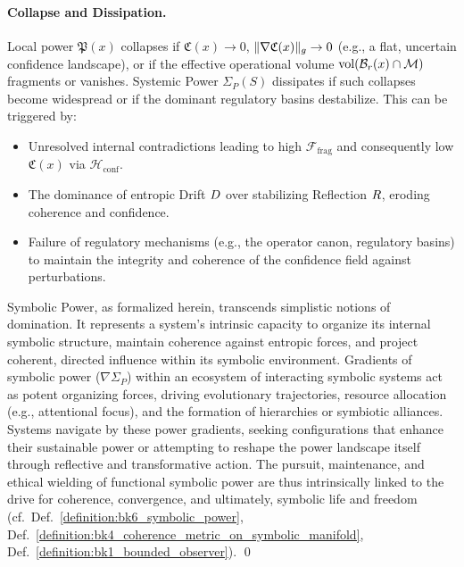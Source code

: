 \paragraph{Collapse and Dissipation.} Local power \(\mathfrak{P}(x)\) collapses if \(\mathfrak{C}(x) \to 0\), \(\|\nabla \mathfrak{C}(x)\|_{g} \to 0\) (e.g., a flat, uncertain confidence landscape), or if the effective operational volume \(\text{vol}(\mathcal{B}_r(x) \cap \mathcal{M})\) fragments or vanishes. Systemic Power \(\Sigma_P(S)\) dissipates if such collapses become widespread or if the dominant regulatory basins destabilize. This can be triggered by:
\begin{itemize}
    \item Unresolved internal contradictions leading to high \(\mathcal{F}_{\text{frag}}\) and consequently low \(\mathfrak{C}(x)\) via \(\mathcal{H}_{\text{conf}}\).
    \item The dominance of entropic Drift \(D\) over stabilizing Reflection \(R\), eroding coherence and confidence.
    \item Failure of regulatory mechanisms (e.g., the operator canon, regulatory basins) to maintain the integrity and coherence of the confidence field against perturbations.
\end{itemize}

\begin{scholium}
\label{scholium:bk7_power_organizational_navigational}
Symbolic Power, as formalized herein, transcends simplistic notions of domination. It represents a system's intrinsic capacity to organize its internal symbolic structure, maintain coherence against entropic forces, and project coherent, directed influence within its symbolic environment. Gradients of symbolic power (\(\nabla \Sigma_P\)) within an ecosystem of interacting symbolic systems act as potent organizing forces, driving evolutionary trajectories, resource allocation (e.g., attentional focus), and the formation of hierarchies or symbiotic alliances. Systems navigate by these power gradients, seeking configurations that enhance their sustainable power or attempting to reshape the power landscape itself through reflective and transformative action. The pursuit, maintenance, and ethical wielding of functional symbolic power are thus intrinsically linked to the drive for coherence, convergence, and ultimately, symbolic life and freedom (cf.~Def.~\ref{definition:bk6_symbolic_power}, Def.~\ref{definition:bk4_coherence_metric_on_symbolic_manifold}, Def.~\ref{definition:bk1_bounded_observer}). \qed
\end{scholium}

